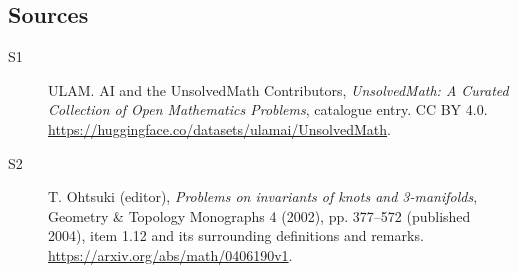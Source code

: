 \documentclass[11pt]{article}
\begin{document}
\subsection{Sources}
\begin{description}
\item[\hypertarget{source:statement:1}{S1}] ULAM. AI and the UnsolvedMath Contributors, \emph{UnsolvedMath: A Curated Collection of Open Mathematics Problems}, catalogue entry. CC BY 4.0. \url{https://huggingface.co/datasets/ulamai/UnsolvedMath}.
\item[\hypertarget{source:statement:2}{S2}] T. Ohtsuki (editor), \emph{Problems on invariants of knots and 3-manifolds}, Geometry \& Topology Monographs 4 (2002), pp. 377--572 (published 2004), item 1.12 and its surrounding definitions and remarks. \url{https://arxiv.org/abs/math/0406190v1}.
\end{description}
\label{end:statement}
\end{document}
